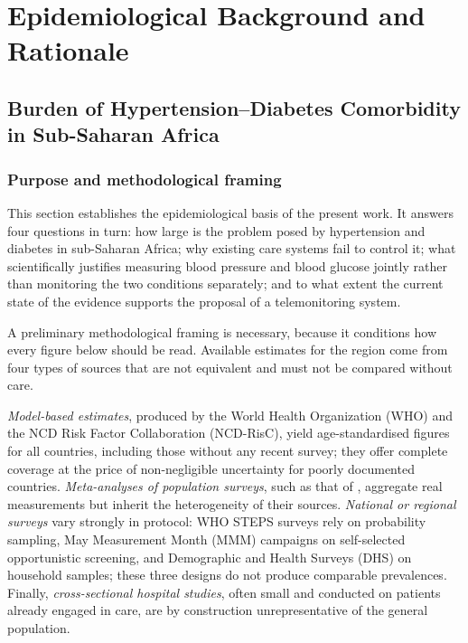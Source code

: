 \documentclass[12pt,a4paper,oneside]{report}
\begin{document}
\chapter{Epidemiological Background and Rationale}\label{ch:background}

\section{Burden of Hypertension--Diabetes Comorbidity in Sub-Saharan Africa}\label{sec:burden}

\subsection*{Purpose and methodological framing}

This section establishes the epidemiological basis of the present work. It answers four questions in turn: how large is the problem posed by hypertension and diabetes in sub-Saharan Africa; why existing care systems fail to control it; what scientifically justifies measuring blood pressure and blood glucose jointly rather than monitoring the two conditions separately; and to what extent the current state of the evidence supports the proposal of a telemonitoring system.

A preliminary methodological framing is necessary, because it conditions how every figure below should be read. Available estimates for the region come from four types of sources that are not equivalent and must not be compared without care.

\emph{Model-based estimates}, produced by the World Health Organization (WHO) and the NCD Risk Factor Collaboration (NCD-RisC), yield age-standardised figures for all countries, including those without any recent survey; they offer complete coverage at the price of non-negligible uncertainty for poorly documented countries. \emph{Meta-analyses of population surveys}, such as that of \textcite{ataklte2015}, aggregate real measurements but inherit the heterogeneity of their sources. \emph{National or regional surveys} vary strongly in protocol: WHO STEPS surveys rely on probability sampling, May Measurement Month (MMM) campaigns on self-selected opportunistic screening, and Demographic and Health Surveys (DHS) on household samples; these three designs do not produce comparable prevalences. Finally, \emph{cross-sectional hospital studies}, often small and conducted on patients already engaged in care, are by construction unrepresentative of the general population.
\end{document}
